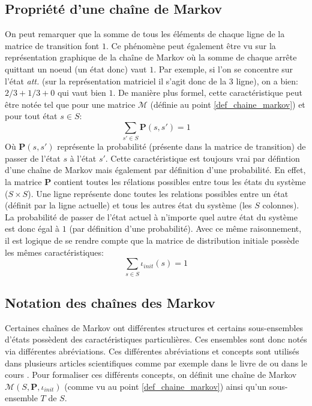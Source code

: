 \documentclass[letterpaper]{article}
\begin{document}
  \subsection{Propriété d'une chaîne de Markov}
    On peut remarquer que la somme de tous les éléments de chaque ligne de la
    matrice de transition font $1$.  Ce phénomène peut également être vu
    sur la représentation graphique de la chaîne de Markov où la somme de chaque
    arrête quittant un noeud (un état donc) vaut $1$.  Par exemple, si l'on se
    concentre sur l'état \textit{att.} (sur la représentation matriciel il s'agit donc 
    de la 3 ligne), on a bien: $2/3 + 1/3 + 0$ qui vaut bien $1$.  De manière 
    plus formel, cette caractéristique peut être notée tel que pour une matrice
    $\mathcal{M}$ (définie au point \ref{def_chaine_markov}) et pour tout état $s \in S$:
    $$\sum\limits_{s' \in S} \mathbf{P}(s, s') = 1$$
    Où $\mathbf{P}(s, s')$ représente la probabilité (présente dans la matrice de
    transition) de passer de l'état $s$ à l'état $s'$.  Cette caractéristique est
    toujours vrai par défintion d'une chaîne de Markov mais également par définition
    d'une probabilité.
    En effet, la matrice $\mathbf{P}$ contient toutes les rélations possibles entre
    tous les états du système ($S \times S$).  Une ligne représente donc toutes les 
    relations possibles entre un état (définit par la ligne actuelle) et tous les autres
    état du système (les $S$ colonnes).  La probabilité de passer de l'état actuel
    à n'importe quel autre état du système est donc égal à $1$ (par définition d'une probabilité).
    Avec ce même raisonnement, il est logique de se rendre compte que la matrice
    de distribution initiale possède les mêmes caractéristiques:
    $$\sum\limits_{s \in S} \iota_{init}(s) = 1$$
    
  \subsection{Notation des chaînes des Markov}
    Certaines chaînes de Markov ont différentes structures et certains
    sous-ensembles d'états possèdent des caractéristiques particulières.
    Ces ensembles sont donc notés via différentes abréviations.  Ces différentes
    abréviations et concepts sont utilisés dans plusieurs articles scientifiques
    comme par exemple dans le livre de \citet{ModelChecking} ou dans le cours
    \citet{COURS}.  Pour formaliser ces différents concepts, on définit 
    une chaîne de Markov $\mathcal{M}(S, \mathbf{P}, \iota_{init})$ 
    (comme vu au point \ref{def_chaine_markov}) ainsi qu'un sous-ensemble $T$ de $S$.
    
\end{document}
